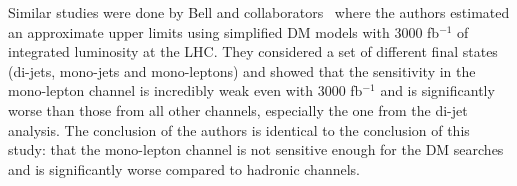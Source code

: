 % 

Similar studies were done by Bell and collaborators~\cite{arXiv:1512.00476} where the authors estimated an approximate upper limits using simplified DM models with 3000 fb$^{-1}$ of integrated luminosity at the LHC. 
They considered a set of different final states (di-jets, mono-jets and mono-leptons)
and showed that the 
sensitivity 
in the mono-lepton channel is incredibly weak even with 3000 fb$^{-1}$ and is significantly worse than those from all other channels, especially the one from the di-jet analysis. 
The conclusion of the authors is identical to the conclusion of this study: that the mono-lepton channel is not sensitive enough for the DM searches and is significantly worse compared to hadronic channels.




%
